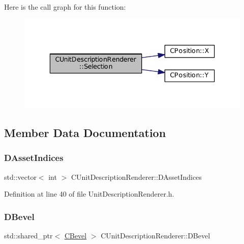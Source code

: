 Here is the call graph for this function\+:
\nopagebreak
\begin{figure}[H]
\begin{center}
\leavevmode
\includegraphics[width=336pt]{classCUnitDescriptionRenderer_a6ef0c9f010b5502def622e6d830795c7_cgraph}
\end{center}
\end{figure}


\subsection{Member Data Documentation}
\hypertarget{classCUnitDescriptionRenderer_a3d311375ab23745786d20076842e3099}{}\label{classCUnitDescriptionRenderer_a3d311375ab23745786d20076842e3099} 
\subsubsection{\texorpdfstring{D\+Asset\+Indices}{DAssetIndices}}
{\footnotesize\ttfamily std\+::vector$<$ int $>$ C\+Unit\+Description\+Renderer\+::\+D\+Asset\+Indices\hspace{0.3cm}{\ttfamily [protected]}}



Definition at line 40 of file Unit\+Description\+Renderer.\+h.

\hypertarget{classCUnitDescriptionRenderer_a9f4cd9f9d8dbc5036c885980494db41e}{}\label{classCUnitDescriptionRenderer_a9f4cd9f9d8dbc5036c885980494db41e} 
\subsubsection{\texorpdfstring{D\+Bevel}{DBevel}}
{\footnotesize\ttfamily std\+::shared\+\_\+ptr$<$ \hyperlink{classCBevel}{C\+Bevel} $>$ C\+Unit\+Description\+Renderer\+::\+D\+Bevel\hspace{0.3cm}{\ttfamily [protected]}}



